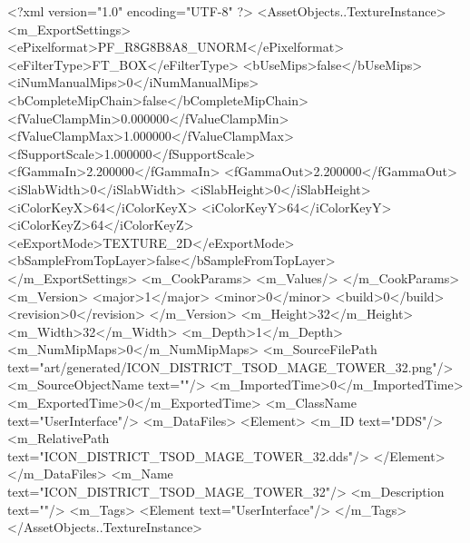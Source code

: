<?xml version="1.0" encoding="UTF-8" ?>
<AssetObjects..TextureInstance>
	<m_ExportSettings>
		<ePixelformat>PF_R8G8B8A8_UNORM</ePixelformat>
		<eFilterType>FT_BOX</eFilterType>
		<bUseMips>false</bUseMips>
		<iNumManualMips>0</iNumManualMips>
		<bCompleteMipChain>false</bCompleteMipChain>
		<fValueClampMin>0.000000</fValueClampMin>
		<fValueClampMax>1.000000</fValueClampMax>
		<fSupportScale>1.000000</fSupportScale>
		<fGammaIn>2.200000</fGammaIn>
		<fGammaOut>2.200000</fGammaOut>
		<iSlabWidth>0</iSlabWidth>
		<iSlabHeight>0</iSlabHeight>
		<iColorKeyX>64</iColorKeyX>
		<iColorKeyY>64</iColorKeyY>
		<iColorKeyZ>64</iColorKeyZ>
		<eExportMode>TEXTURE_2D</eExportMode>
		<bSampleFromTopLayer>false</bSampleFromTopLayer>
	</m_ExportSettings>
	<m_CookParams>
		<m_Values/>
	</m_CookParams>
	<m_Version>
		<major>1</major>
		<minor>0</minor>
		<build>0</build>
		<revision>0</revision>
	</m_Version>
	<m_Height>32</m_Height>
	<m_Width>32</m_Width>
	<m_Depth>1</m_Depth>
	<m_NumMipMaps>0</m_NumMipMaps>
	<m_SourceFilePath text="art/generated/ICON_DISTRICT_TSOD_MAGE_TOWER_32.png"/>
	<m_SourceObjectName text=""/>
	<m_ImportedTime>0</m_ImportedTime>
	<m_ExportedTime>0</m_ExportedTime>
	<m_ClassName text="UserInterface"/>
	<m_DataFiles>
		<Element>
			<m_ID text="DDS"/>
			<m_RelativePath text="ICON_DISTRICT_TSOD_MAGE_TOWER_32.dds"/>
		</Element>
	</m_DataFiles>
	<m_Name text="ICON_DISTRICT_TSOD_MAGE_TOWER_32"/>
	<m_Description text=""/>
	<m_Tags>
		<Element text="UserInterface"/>
	</m_Tags>
</AssetObjects..TextureInstance>
